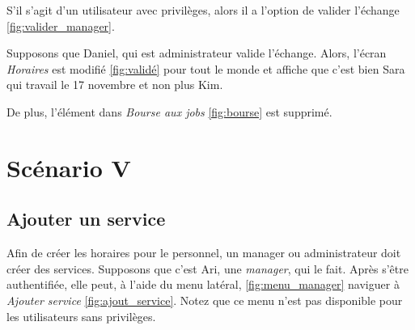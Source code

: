 S'il s'agit d'un utilisateur avec privilèges, alors il a l'option de valider l'échange \ref{fig:valider_manager}. 

Supposons que Daniel, qui est administrateur valide l'échange. Alors, l'écran \textit{Horaires} est modifié \ref{fig:validé}
pour tout le monde et affiche que c'est bien Sara qui travail le 17 novembre et non plus Kim. 

De plus, l'élément dans \textit{Bourse aux jobs} \ref{fig:bourse} est supprimé.
\newpage
\section[Ajouter un service - Scénario V]{Scénario V}
    \subsection*{Ajouter un service}
    Afin de créer les horaires pour le personnel, un manager ou administrateur doit créer des services. Supposons
    que c'est Ari, une \textit{manager}, qui le fait. Après s'être authentifiée, elle peut, à l'aide du menu latéral, \ref{fig:menu_manager} naviguer
    à \textit{Ajouter service} \ref{fig:ajout_service}. Notez que ce menu n'est pas disponible pour les utilisateurs sans privilèges.

